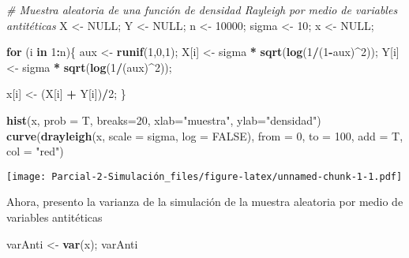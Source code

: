 \documentclass[
]{article}
\newenvironment{Shaded}{\begin{snugshade}}{\end{snugshade}}
\newcommand{\CommentTok}[1]{\textcolor[rgb]{0.56,0.35,0.01}{\textit{#1}}}
\newcommand{\ControlFlowTok}[1]{\textcolor[rgb]{0.13,0.29,0.53}{\textbf{#1}}}
\newcommand{\DataTypeTok}[1]{\textcolor[rgb]{0.13,0.29,0.53}{#1}}
\newcommand{\DecValTok}[1]{\textcolor[rgb]{0.00,0.00,0.81}{#1}}
\newcommand{\KeywordTok}[1]{\textcolor[rgb]{0.13,0.29,0.53}{\textbf{#1}}}
\newcommand{\NormalTok}[1]{#1}
\newcommand{\OperatorTok}[1]{\textcolor[rgb]{0.81,0.36,0.00}{\textbf{#1}}}
\newcommand{\OtherTok}[1]{\textcolor[rgb]{0.56,0.35,0.01}{#1}}
\newcommand{\StringTok}[1]{\textcolor[rgb]{0.31,0.60,0.02}{#1}}
\begin{document}
\begin{Shaded}
\begin{Highlighting}[]
\CommentTok{# Muestra aleatoria de una función de densidad Rayleigh por medio de variables antitéticas}
\NormalTok{X <-}\StringTok{ }\OtherTok{NULL}\NormalTok{; Y <-}\StringTok{ }\OtherTok{NULL}\NormalTok{; n <-}\StringTok{ }\DecValTok{10000}\NormalTok{; sigma <-}\StringTok{ }\DecValTok{10}\NormalTok{; x <-}\StringTok{ }\OtherTok{NULL}\NormalTok{;}

\ControlFlowTok{for}\NormalTok{ (i }\ControlFlowTok{in} \DecValTok{1}\OperatorTok{:}\NormalTok{n)\{}
\NormalTok{  aux <-}\StringTok{ }\KeywordTok{runif}\NormalTok{(}\DecValTok{1}\NormalTok{,}\DecValTok{0}\NormalTok{,}\DecValTok{1}\NormalTok{);}
\NormalTok{  X[i] <-}\StringTok{ }\NormalTok{sigma }\OperatorTok{*}\StringTok{ }\KeywordTok{sqrt}\NormalTok{(}\KeywordTok{log}\NormalTok{(}\DecValTok{1}\OperatorTok{/}\NormalTok{(}\DecValTok{1}\OperatorTok{-}\NormalTok{aux)}\OperatorTok{^}\DecValTok{2}\NormalTok{));}
\NormalTok{  Y[i] <-}\StringTok{ }\NormalTok{sigma }\OperatorTok{*}\StringTok{ }\KeywordTok{sqrt}\NormalTok{(}\KeywordTok{log}\NormalTok{(}\DecValTok{1}\OperatorTok{/}\NormalTok{(aux)}\OperatorTok{^}\DecValTok{2}\NormalTok{));}
  
\NormalTok{  x[i] <-}\StringTok{ }\NormalTok{(X[i] }\OperatorTok{+}\StringTok{ }\NormalTok{Y[i])}\OperatorTok{/}\DecValTok{2}\NormalTok{;}
\NormalTok{\}}

\KeywordTok{hist}\NormalTok{(x, }\DataTypeTok{prob =}\NormalTok{ T, }\DataTypeTok{breaks=}\DecValTok{20}\NormalTok{, }\DataTypeTok{xlab=}\StringTok{"muestra"}\NormalTok{, }\DataTypeTok{ylab=}\StringTok{"densidad"}\NormalTok{)}
\KeywordTok{curve}\NormalTok{(}\KeywordTok{drayleigh}\NormalTok{(x, }\DataTypeTok{scale =}\NormalTok{ sigma, }\DataTypeTok{log =} \OtherTok{FALSE}\NormalTok{), }\DataTypeTok{from =} \DecValTok{0}\NormalTok{, }\DataTypeTok{to =} \DecValTok{100}\NormalTok{, }\DataTypeTok{add =}\NormalTok{ T, }\DataTypeTok{col =} \StringTok{"red"}\NormalTok{)}
\end{Highlighting}
\end{Shaded}

\texttt{[image: Parcial-2-Simulación\_files/figure-latex/unnamed-chunk-1-1.pdf]}

Ahora, presento la varianza de la simulación de la muestra aleatoria por
medio de variables antitéticas

\begin{Shaded}
\begin{Highlighting}[]
\NormalTok{varAnti <-}\StringTok{ }\KeywordTok{var}\NormalTok{(x);}
\NormalTok{varAnti}
\end{Highlighting}
\end{Shaded}
\end{document}
